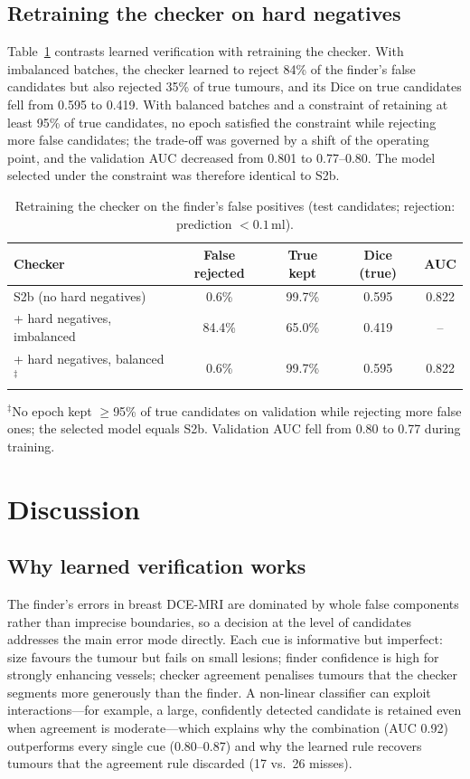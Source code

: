 \documentclass[journal]{IEEEtran}
\begin{document}
\subsection{Retraining the checker on hard negatives}
Table~\ref{tab:s2c} contrasts learned verification with retraining the checker. With imbalanced batches, the checker learned to reject 84\% of the finder's false candidates but also rejected 35\% of true tumours, and its Dice on true candidates fell from 0.595 to 0.419. With balanced batches and a constraint of retaining at least 95\% of true candidates, no epoch satisfied the constraint while rejecting more false candidates; the trade-off was governed by a shift of the operating point, and the validation AUC decreased from 0.801 to 0.77--0.80. The model selected under the constraint was therefore identical to S2b.

\begin{table}[t]
\centering
\caption{Retraining the checker on the finder's false positives (test candidates; rejection: prediction $<0.1$\,ml).}
\label{tab:s2c}
\setlength{\tabcolsep}{3pt}
\begin{tabular}{lcccc}
\toprule
Checker & False rejected & True kept & Dice (true) & AUC \\
\midrule
S2b (no hard negatives) & 0.6\% & 99.7\% & 0.595 & 0.822 \\
+ hard negatives, imbalanced & 84.4\% & 65.0\% & 0.419 & -- \\
+ hard negatives, balanced$^\ddagger$ & 0.6\% & 99.7\% & 0.595 & 0.822 \\
\bottomrule
\end{tabular}

\vspace{1mm}
\parbox{\columnwidth}{\scriptsize $^\ddagger$No epoch kept $\ge$95\% of true candidates on validation while rejecting more false ones; the selected model equals S2b. Validation AUC fell from 0.80 to 0.77 during training.}
\end{table}

\section{Discussion}

\subsection{Why learned verification works}
The finder's errors in breast DCE-MRI are dominated by whole false components rather than imprecise boundaries, so a decision at the level of candidates addresses the main error mode directly. Each cue is informative but imperfect: size favours the tumour but fails on small lesions; finder confidence is high for strongly enhancing vessels; checker agreement penalises tumours that the checker segments more generously than the finder. A non-linear classifier can exploit interactions---for example, a large, confidently detected candidate is retained even when agreement is moderate---which explains why the combination (AUC 0.92) outperforms every single cue (0.80--0.87) and why the learned rule recovers tumours that the agreement rule discarded (17 vs.\ 26 misses).
\end{document}

